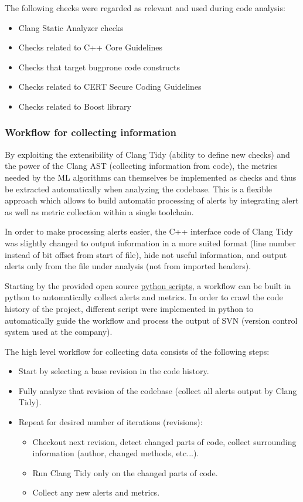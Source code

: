 The following checks were regarded as relevant and used during code analysis:
\begin{itemize}
	\item Clang Static Analyzer checks
	\item Checks related to C++ Core Guidelines
	\item Checks that target bugprone code constructs
	\item Checks related to CERT Secure Coding Guidelines
	\item Checks related to Boost library
\end{itemize}

\subsubsection{Workflow for collecting information \label{data_collection}}

By exploiting the extensibility of Clang Tidy (ability to define new checks) and the power of the Clang AST (collecting information from code), the metrics needed by the ML algorithms can themselves be implemented as checks and thus be extracted automatically when analyzing the codebase. This is a flexible approach which allows to build automatic processing of alerts by integrating alert as well as metric collection within a single toolchain.

In order to make processing alerts easier, the C++ interface code of Clang Tidy was slightly changed to output information in a more suited format (line number instead of bit offset from start of file), hide not useful information, and output alerts only from the file under analysis (not from imported headers).

Starting by the provided open source \href{https://github.com/llvm-mirror/clang-tools-extra/blob/master/clang-tidy/tool/run-clang-tidy.py}{python scripts}, a workflow can be built in python to automatically collect alerts and metrics. In order to crawl the code history of the project, different script were implemented in python to automatically guide the workflow and process the output of SVN (version control system used at the company).

The high level workflow for collecting data consists of the following steps:
\begin{itemize}
    \item Start by selecting a base revision in the code history.
    \item Fully analyze that revision of the codebase (collect all alerts output by Clang Tidy).
    \item Repeat for desired number of iterations (revisions):
        \begin{itemize}
            \item Checkout next revision, detect changed parts of code, collect surrounding information (author, changed methods, etc...).
            \item Run Clang Tidy only on the changed parts of code.
            \item Collect any new alerts and metrics.
        \end{itemize} 
\end{itemize}


